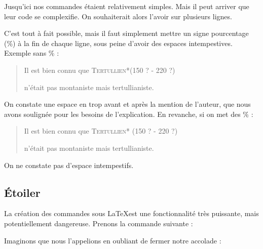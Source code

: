 Jusqu'ici nos commandes étaient relativement simples. Mais il peut arriver que leur code se complexifie. On souhaiterait alors l'avoir sur plusieurs lignes.

C'est tout à fait possible, mais il faut simplement mettre  un signe pourcentage (\%) à la fin de chaque ligne, sous peine d'avoir  des espaces intempestives. Exemple sans  \% :

\begin{latexcode}
\newcommand{\auteur}[2]{
	\textsc{#1}*(#2)
	}
\end{latexcode}

\renewcommand{\auteur}[2]{\underline{ }%
	\textsc{#1}*(#2)\underline{ }%
}

\begin{quotation}
Il est bien connu que \auteur{Tertullien}{150 ? - 220 ?}
n'était pas montaniste mais tertullianiste.
\end{quotation}

On constate une espace en trop avant et après la mention de l'auteur, que nous avons soulignée pour les besoins de l'explication.
En revanche, si on met des \% :

\begin{latexcode}
\newcommand{\auteur}[2]{%
	\textsc{#1} *(#2)%
	}
\end{latexcode}

\renewcommand{\auteur}[2]{%
	\textsc{#1}* (#2)%
}

\begin{quotation}
Il est bien connu que \auteur{Tertullien}{150 ? - 220 ?}
n'était pas montaniste mais tertullianiste.
\end{quotation}

On ne constate pas d'espace intempestifs.


\subsection{Étoiler }

La création des commandes sous \LaTeX est une fonctionnalité très puissante, mais potentiellement dangereuse. Prenons la commande suivante :

\begin{latexcode}
\newcommand{\auteur}[1]{\textsc{#1}*}
\end{latexcode}

Imaginons que nous l'appelions en oubliant de fermer notre accolade :

\begin{latexcode}
Il est bien connu que \auteur{Tertullien n'était pas montaniste mais tertullianiste.
\end{latexcode}


